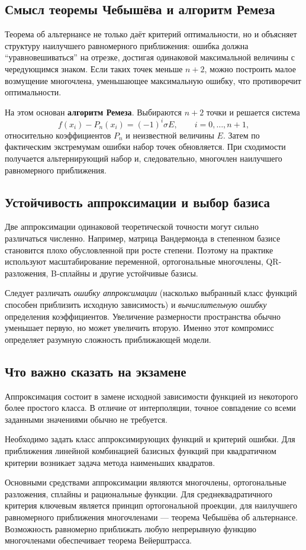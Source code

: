 \subsection{Смысл теоремы Чебышёва и алгоритм Ремеза}

Теорема об альтернансе не только даёт критерий оптимальности, но и объясняет структуру
наилучшего равномерного приближения: ошибка должна ``уравновешиваться'' на отрезке,
достигая одинаковой максимальной величины с чередующимся знаком. Если таких точек
меньше $n+2$, можно построить малое возмущение многочлена, уменьшающее максимальную
ошибку, что противоречит оптимальности.

На этом основан \textbf{алгоритм Ремеза}. Выбираются $n+2$ точки и решается система
\[
    f(x_i)-P_n(x_i)=(-1)^i\sigma E,
    \qquad i=0,\ldots,n+1,
\]
относительно коэффициентов $P_n$ и неизвестной величины $E$. Затем по фактическим
экстремумам ошибки набор точек обновляется. При сходимости получается альтернирующий
набор и, следовательно, многочлен наилучшего равномерного приближения.

\subsection{Устойчивость аппроксимации и выбор базиса}

Две аппроксимации одинаковой теоретической точности могут сильно различаться численно.
Например, матрица Вандермонда в степенном базисе становится плохо обусловленной при
росте степени. Поэтому на практике используют масштабирование переменной,
ортогональные многочлены, QR-разложения, B-сплайны и другие устойчивые базисы.

Следует различать \emph{ошибку аппроксимации} (насколько выбранный класс функций способен
приблизить исходную зависимость) и \emph{вычислительную ошибку} определения коэффициентов.
Увеличение размерности пространства обычно уменьшает первую, но может увеличить вторую.
Именно этот компромисс определяет разумную сложность приближающей модели.

\subsection{Что важно сказать на экзамене}

Аппроксимация состоит в замене исходной зависимости функцией из некоторого более простого класса. В отличие от интерполяции, точное совпадение со всеми заданными значениями обычно не требуется.

Необходимо задать класс аппроксимирующих функций и критерий ошибки. Для приближения линейной комбинацией базисных функций при квадратичном критерии возникает задача метода наименьших квадратов.

Основными средствами аппроксимации являются многочлены, ортогональные разложения,
сплайны и рациональные функции. Для среднеквадратичного критерия ключевым является
принцип ортогональной проекции, для наилучшего равномерного приближения
многочленами --- теорема Чебышёва об альтернансе. Возможность равномерно
приближать любую непрерывную функцию многочленами обеспечивает теорема
Вейерштрасса.

\newpage